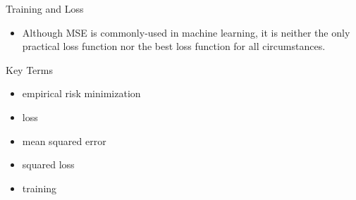 \documentclass{beamer}
\begin{document}
\begin{frame}{Training and Loss}
\begin{itemize}
    \item Although MSE is commonly-used in machine learning, it is neither the only practical loss function nor the best loss function for all circumstances.
\end{itemize}
\end{frame}


\begin{frame}{Key Terms}
\begin{itemize}
\item empirical risk minimization
\item loss
\item mean squared error
\item squared loss
\item training
\end{itemize}
\end{frame}
\end{document}
